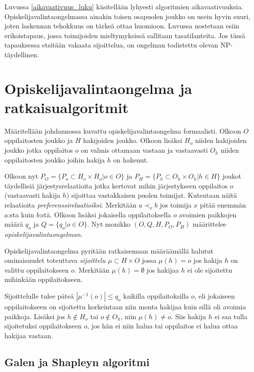 \documentclass[twoside]{tktltiki}
\begin{document}
Luvussa \ref{aikavaativuus_luku} käsitellään lyhyesti algoritmien
aikavaativuuksia. Opiskelijavalintaongelmassa ainakin toisen osapuolen
joukko on usein hyvin suuri, joten laskennan tehokkuus on tärkeä ottaa
huomioon. Luvussa nostetaan esiin erikoistapaus, jossa toimijoiden
mieltymyksissä sallitaan tasatilanteita. Jos tässä tapauksessa
etsitään vakaata sijoittelua, on ongelman todistettu olevan
NP-täydellinen.

\section{Opiskelijavalintaongelma ja ratkaisualgoritmit}
\label{algoritmit_luku}

Määritellään johdannossa kuvattu opiskelijavalintaongelma formaalisti.
Olkoon $O$ oppilaitosten joukko ja $H$ hakijoiden joukko. Olkoon
lisäksi $H_o$ niiden hakijoiden joukko jotka oppilaitos $o$ on valmis
ottamaan vastaan ja vastaavasti $O_h$ niiden oppilaitosten joukko
joihin hakija $h$ on hakenut.

Olkoon nyt $P_O = \{P_o \subset H_o \times H_o | o \in O\}$ ja $P_H =
\{P_h \subset O_h \times O_h | h \in H\}$ joukot täydellisiä
järjestysrelaatioita jotka kertovat mihin järjestykseen oppilaitos $o$
(vastaavasti hakija $h$) sijoittaa vastakkaisen puolen toimijat.
Kutsutaan näitä relaatioita \emph{preferenssirelaatioiksi}. Merkitään
$a \prec_x b$ jos toimija $x$ pitää enemmän $a$:sta kuin $b$:stä.
Olkoon lisäksi jokaisella oppilaitoksella $o$ avoimien paikkojen määrä
$q_o$ ja $Q = \{q_o | o \in O\}$. Nyt monikko $(O, Q, H, P_O, P_H)$
määrittelee \emph{opiskelijavalintaongelman}.

Opiskelijavalintaongelma pyritään ratkaisemaan määräämällä halutut
ominaisuudet toteuttava \emph{sijoittelu} $\mu \subset H \times O$
jossa $\mu(h) = o$ jos hakija $h$ on valittu oppilaitokseen $o$.
Merkitään $\mu(h) = \emptyset$ jos hakijaa $h$ ei ole sijoitettu
mihinkään oppilaitokseen.

Sijoittelulle tulee päteä $|\mu^{-1}(o)| \leq q_o$ kaikilla
oppilaitoksilla $o$, eli jokaiseen oppilaitokseen on sijoitettu
korkeintaan niin monta hakijaa kuin sillä oli avoimia paikkoja.
Lisäksi jos $h \notin H_o$ tai $o \notin O_h$, niin $\mu(h) \neq o$.
Siis hakija $h$ ei saa tulla sijoitetuksi oppilaitokseen $o$, jos hän
ei niin halua tai oppilaitos ei halua ottaa hakijaa vastaan.

\subsection{Galen ja Shapleyn algoritmi}
\end{document}
